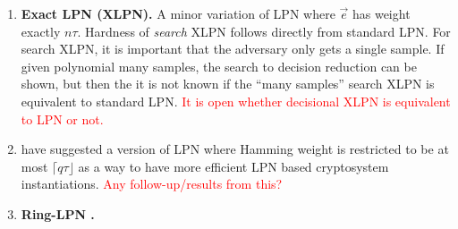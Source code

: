 \begin{enumerate}
	\item  \textbf{Exact LPN (XLPN).} A minor variation of LPN where $ \vec{e} $ has weight exactly $ n \tau $. 
	Hardness of \textit{search} XLPN follows directly from standard LPN.
	For search XLPN, it is important that the adversary only gets a single sample.
	If given polynomial many samples, the search to decision reduction can be shown, but then the it is not known if the ``many samples'' search XLPN is equivalent to standard LPN.
	\textcolor{red}{It is open whether decisional XLPN is equivalent to LPN or not.}
	
	\item \cite{JC:KatShiSmi10} have suggested a version of LPN where Hamming weight is restricted to be at most $\lceil q\tau \rfloor$ as a way to have more efficient LPN based cryptosystem instantiations.
	\textcolor{red}{Any follow-up/results from this?}
	
	\item \textbf{Ring-LPN \cite{HKLPP12}.} 
	
\end{enumerate} 

